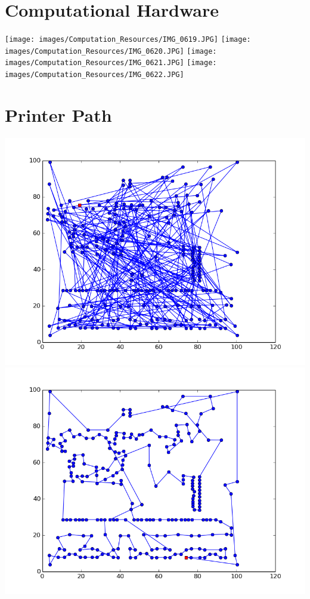 \documentclass[12pt]{article}
\begin{document}
\maketitle

\section{Computational Hardware}
\texttt{[image: images/Computation\_Resources/IMG\_0619.JPG]}
\texttt{[image: images/Computation\_Resources/IMG\_0620.JPG]}
\texttt{[image: images/Computation\_Resources/IMG\_0621.JPG]}
\texttt{[image: images/Computation\_Resources/IMG\_0622.JPG]}
\section{Printer Path}
\includegraphics{images/Path/original_path.png}
\includegraphics{images/Path/best_found_path.png}
\end{document}
